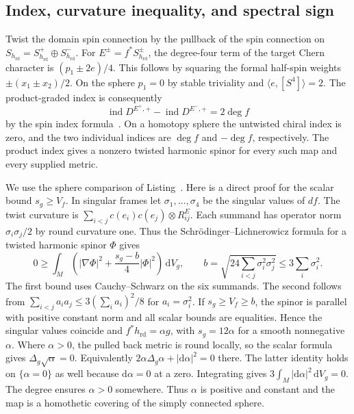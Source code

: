 \documentclass[11pt]{article}
\numberwithin{equation}{section}
\DeclareMathOperator{\ind}{ind}
\newcommand{\rd}{\mathrm{rd}}
\newcommand{\dd}{\mathrm{d}}
\newcommand{\abs}[1]{\lvert #1\rvert}
\newcommand{\dv}{\dd V_g}
\begin{document}
\subsection{Index, curvature inequality, and spectral sign}

Twist the domain spin connection by the pullback of the spin
connection on \(S_{h_{\rd}}=S_{h_{\rd}}^+\oplus S_{h_{\rd}}^-\).
For \(E^\pm=f^*S_{h_{\rd}}^\pm\), the degree-four term of the target
Chern character is \((p_1\pm 2e)/4\). This follows by squaring the
formal half-spin weights \(\pm(x_1\pm x_2)/2\).
On the sphere \(p_1=0\) by stable triviality and \(\langle e,[S^4]\rangle=2\).
The product-graded index is consequently
\[
 \ind D^{E^+,+}-\ind D^{E^-,+}=2\deg f
\]
by the spin index formula~\cite{AtiyahSinger1963Index}. On a
homotopy sphere the untwisted chiral index is zero, and the two
individual indices are \(\deg f\) and \(-\deg f\), respectively.
The product index gives a nonzero twisted harmonic spinor for
every such map and every supplied metric.

We use the sphere comparison of Listing~\cite[Theorem~3]{Listing2010ScalarSymmetric}.
Here is a direct proof for the scalar bound \(s_g\ge V_f\).
In singular frames let \(\sigma_1,\ldots,\sigma_4\) be the singular
values of \(df\). The twist curvature is
\(\sum_{i<j}c(e_i)c(e_j)\otimes R^E_{ij}\). Each summand has operator
norm \(\sigma_i\sigma_j/2\) by round curvature one. Thus the
Schr\"odinger--Lichnerowicz formula for a twisted harmonic spinor
\(\Phi\) gives
\[
 0\ge \int_M\left(\abs{\nabla\Phi}^2+
              \frac{s_g-b}{4}\abs{\Phi}^2\right)\,\dv,\qquad
 b=\sqrt{24\sum_{i<j}\sigma_i^2\sigma_j^2}\le 3\sum_i\sigma_i^2.
\]
The first bound uses Cauchy--Schwarz on the six summands.
The second follows from
\(\sum_{i<j}a_i a_j\le 3(\sum_i a_i)^2/8\) for \(a_i=\sigma_i^2\).
If \(s_g\ge V_f\ge b\), the spinor is parallel with positive constant
norm and all scalar bounds are equalities. Hence the singular
values coincide and \(f^*h_{\rd}=\alpha g\), with
\(s_g=12\alpha\) for a smooth nonnegative \(\alpha\).
Where \(\alpha>0\), the pulled back metric is round locally, so the
scalar formula gives \(\Delta_g\sqrt{\alpha}=0\).
Equivalently \(2\alpha\Delta_g\alpha+\abs{\dd\alpha}^2=0\) there.
The latter identity holds on \(\{\alpha=0\}\) as well because
\(\dd\alpha=0\) at a zero. Integrating gives
\(3\int_M\abs{\dd\alpha}^2\,\dv=0\). The degree ensures
\(\alpha>0\) somewhere. Thus \(\alpha\) is positive and constant
and the map is a homothetic covering of the simply connected sphere.
\end{document}
